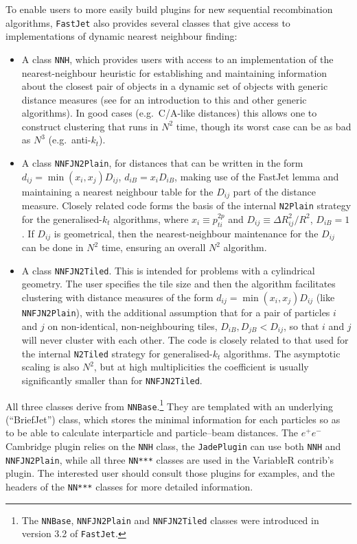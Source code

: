 \documentclass[12pt,a4]{article}
\newcommand{\fastjet}{\texttt{FastJet}\xspace}
\newcommand{\ttt}[1]{{\small\texttt{#1}}}
\newcommand{\ee}{e^+e^-}
\begin{document}
To enable users to more easily build plugins for new sequential
recombination algorithms, \fastjet also provides several classes that
give access to implementations of dynamic nearest neighbour finding: 
\begin{itemize}
\item A class \verb|NNH|, which provides users with access to an
  implementation of the nearest-neighbour heuristic for establishing
  and maintaining information about the closest pair of objects in a
  dynamic set of objects with generic distance measures (see
  \cite{EppsteinHierarchical} for an introduction to this and other
  generic algorithms). In good cases (e.g.\ C/A-like distances) this
  allows one to construct clustering that runs in $N^2$ time, though
  its worst case can be as bad as $N^3$ (e.g.\ anti-$k_t$).
%
\item A class \verb|NNFJN2Plain|, for distances that can be written in
  the form $d_{ij}= \min(x_i, x_j) D_{ij}$, $d_{iB} = x_i D_{iB}$,
  making use of the FastJet lemma and maintaining a nearest neighbour
  table for the $D_{ij}$ part of the distance measure.
  Closely related code forms the basis of the internal \verb|N2Plain|
  strategy for the generalised-$k_t$ algorithms, where
  $x_i \equiv p_{ti}^{2p}$ and $D_{ij} \equiv \Delta R_{ij}^2/R^2$,
  $D_{iB} = 1$.
  If $D_{ij}$ is geometrical, then the nearest-neighbour maintenance
  for the $D_{ij}$ can be done in $N^2$ time, ensuring an overall
  $N^2$ algorithm.
%
\item A class \verb|NNFJN2Tiled|. This is intended for problems with a
  cylindrical geometry. 
  The user specifies the tile size and then the algorithm facilitates
  clustering with distance measures of the form
  $d_{ij}= \min(x_i, x_j) D_{ij}$ (like \verb|NNFJN2Plain|), with
  the additional assumption that for a pair of particles $i$ and $j$
  on non-identical, non-neighbouring tiles, $D_{iB}, D_{jB} <D_{ij}$, so
  that $i$ and $j$ will never cluster with each other.
  The code is closely related to that used for the internal
  \verb|N2Tiled| strategy for generalised-$k_t$ algorithms.
  The asymptotic scaling is also $N^2$, but at high multiplicities the
  coefficient is usually significantly smaller than for
  \verb|NNFJN2Tiled|.
\end{itemize}
All three classes derive from \texttt{NNBase}.\footnote{The \ttt{NNBase},
  \ttt{NNFJN2Plain} and \ttt{NNFJN2Tiled} classes were introduced in
  version 3.2 of \fastjet.}
%
They are templated with an underlying (``BriefJet'') class, which
stores the minimal information for each particles so as to be able to
calculate interparticle and particle--beam distances.
%
The $\ee$ Cambridge plugin relies on the \verb|NNH| class, the
\ttt{JadePlugin} can use both \ttt{NNH} and \ttt{NNFJN2Plain}, while all
three \verb|NN***| classes are used in the VariableR contrib's plugin.
%
The interested user should consult those plugins for examples, and the
headers of the \verb|NN***| classes for more detailed information.
\end{document}

